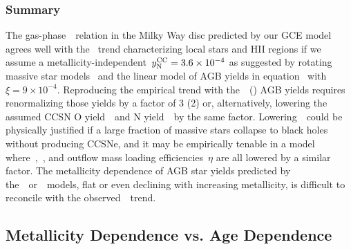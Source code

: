 \documentclass[ms.tex]{subfiles}
\begin{document}
\subsubsection{Summary}
\label{sec:results:yields:summary}
The gas-phase~\ohno~relation in the Milky Way disc predicted by our GCE model
agrees well with the~\citet{Dopita2016} trend characterizing local stars and
HII regions if we assume a metallicity-independent~$y_\text{N}^\text{CC} = 3.6\times10^{-4}$
as suggested by rotating massive star models~\citep{Limongi2018} and the linear
model of AGB yields in equation~
with~$\xi = 9\times10^{-4}$.
Reproducing the empirical trend with the~\cristallo~(\ventura) AGB yields
requires renormalizing those yields by a factor of 3 (2) or, alternatively,
lowering the assumed CCSN O yield~~and N yield~~by the same
factor.
Lowering~~could be physically justified if a large fraction of massive
stars collapse to black holes without producing CCSNe, and it may be
empirically tenable in a model where~,~, and outflow mass
loading efficiencies~$\eta$ are all lowered by a similar factor.
The metallicity dependence of AGB star yields predicted by
the~\karakasten~or~\karakas~models, flat or even declining with increasing
metallicity, is difficult to reconcile with the observed~\ohno~trend.

\subsection{Metallicity Dependence vs. Age Dependence}
\label{sec:results:t_z_dep_comp}
\end{document}
